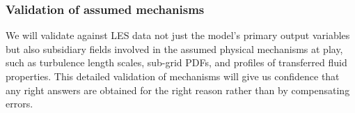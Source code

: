\documentclass[11pt,a4paper]{article}
\begin{document}



\subsubsection*{Validation of assumed mechanisms}

We will validate against LES data not just the model's primary output variables but also subsidiary fields involved in the assumed physical mechanisms at play, such as turbulence length scales, sub-grid PDFs, and profiles of transferred fluid properties. This detailed validation of mechanisms will give us confidence that any right answers are obtained for the right reason rather than by compensating errors.
\end{document}
